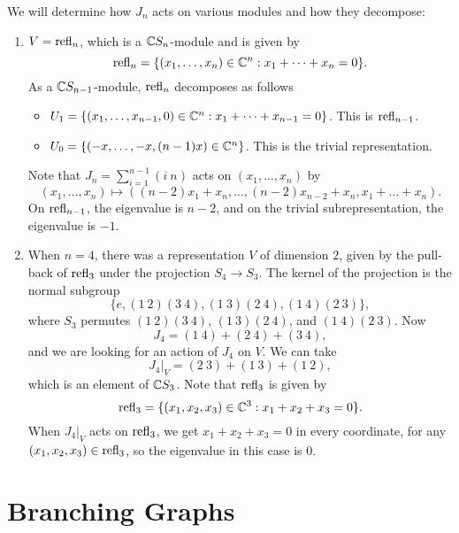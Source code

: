 \begin{example}
  We will determine how $J_n$
  acts on various modules and how they
  decompose:
  \begin{enumerate}
    \item $V = \operatorname{refl}_n$, which is a
      $\mathbb{C} S_n$-module and is given by
      \[
        \operatorname{refl}_n = \{(x_1, \dots, x_n) \in \mathbb{C}^n : x_1 + \dots + x_n = 0\}.
      \]
      As a $\mathbb{C} S_{n - 1}$-module,
      $\operatorname{refl}_n$ decomposes as follows
      \begin{itemize}
        \item $U_1 = \{(x_1, \dots, x_{n - 1}, 0) \in \mathbb{C}^n : x_1 + \dots + x_{n - 1} = 0\}$.
          This is $\operatorname{refl}_{n - 1}$.
        \item $U_0 = \{(-x, \dots, -x, (n - 1)x) \in \mathbb{C}^n\}$.
          This is the trivial representation.
      \end{itemize}
      Note that $J_n = \sum_{i = 1}^{n - 1} (i\ n)$
      acts on $(x_1, \dots, x_n)$ by
      \[
        (x_1, \dots, x_n)
        \longmapsto
        ((n - 2) x_1 + x_n, \dots, (n - 2) x_{n - 2} + x_n, x_1 + \dots + x_n).
      \]
      On $\operatorname{refl}_{n - 1}$, the eigenvalue
      is $n - 2$, and on the trivial
      subrepresentation,
      the eigenvalue is $-1$.
    \item When $n = 4$, there was a
      representation $V$ of dimension $2$,
      given by the pull-back of $\operatorname{refl}_3$
      under the
      projection $S_4 \to S_3$. The kernel
      of the projection is the normal
      subgroup
      \[
        \{e, (1\ 2)(3\ 4), (1\ 3)(2\ 4), (1\ 4)(2\ 3)\},
      \]
      where $S_3$ permutes
      $(1\ 2) (3\ 4)$, $(1\ 3)(2\ 4)$, and
      $(1\ 4)(2\ 3)$. Now
      \[
        J_4 = (1\ 4) + (2\ 4) + (3\ 4),
      \]
      and we are looking for an action
      of $J_4$ on $V$. We can take
      \[
        J_4|_V
        = (2\ 3) + (1\ 3) + (1\ 2),
      \]
      which is an element of $\mathbb{C} S_3$. Note
      that $\operatorname{refl}_3$ is given by
      \[
        \operatorname{refl}_3
        = \{(x_1, x_2, x_3) \in \mathbb{C}^3 : x_1 + x_2 + x_3 = 0\}.
      \]
      When $J_4|_V$ acts on
      $\operatorname{refl}_3$, we get
      $x_1 + x_2 + x_3 = 0$ in every
      coordinate,
      for any $(x_1, x_2, x_3) \in \operatorname{refl}_3$,
      so the eigenvalue in this case is $0$.
  \end{enumerate}
\end{example}

\section{Branching Graphs}

